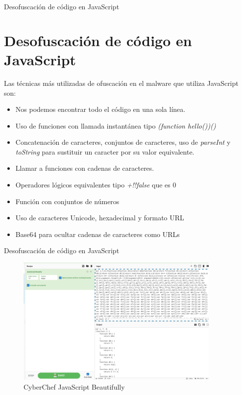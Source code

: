\documentclass[aspectratio=169]{beamer}
\begin{document}
	\begin{frame}{Desofuscación de código en JavaScript}
	\section{Desofuscación de código en JavaScript}
	 Las técnicas más utilizadas de ofuscación en el malware que utiliza JavaScript son:
	
	\begin{itemize}
		\item Nos podemos encontrar todo el código en una sola línea.
		\item Uso de funciones con llamada instantánea tipo \textit{(function hello(){})()}
		\item Concatenación de caracteres, conjuntos de caracteres, uso de \textit{parseInt} y \textit{toString} para sustituir un caracter por su valor equivalente.
		\item Llamar a funciones con cadenas de caracteres.
		\item Operadores lógicos equivalentes tipo \textit{+!!false} que es 0
		\item Función  con conjuntos de números
		\item Uso de caracteres Unicode, hexadecimal y formato URL
		\item Base64 para ocultar cadenas de caracteres como URLs	
	\end{itemize}
	
	\end{frame}
	
	\begin{frame}{Desofuscación de código en JavaScript}
		\begin{figure}[H]
			\centering
			\includegraphics[width=10cm]{images/beautifully.png}
			\caption{CyberChef JavaScript Beautifully}
		\end{figure}
	
	\end{frame}
\end{document}
